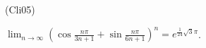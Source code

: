 \begin{tiny}(Cli05)\end{tiny}$\lim_{n\rightarrow \infty }\left( \cos \frac{n\pi }{3n+1}+\sin
\frac{n\pi }{6n+1}\right) ^{n}=e^{\frac{1}{24}\sqrt{3}\pi }$.
